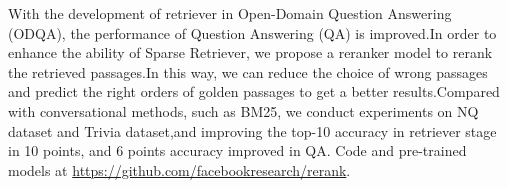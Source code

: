 With the development of retriever in Open-Domain Question Answering (ODQA), the performance of Question Answering (QA) is improved.In order to enhance the ability of Sparse Retriever, we propose a reranker model to rerank the retrieved passages.In this way, we can reduce the choice of wrong passages and predict the right orders of golden passages to get a better results.Compared with conversational methods, such as BM25, we conduct experiments on NQ dataset and Trivia dataset,and  improving the top-10 accuracy in retriever stage in 10 points, and 6 points accuracy improved in QA. Code and pre-trained models at \url{https://github.com/facebookresearch/rerank}.
